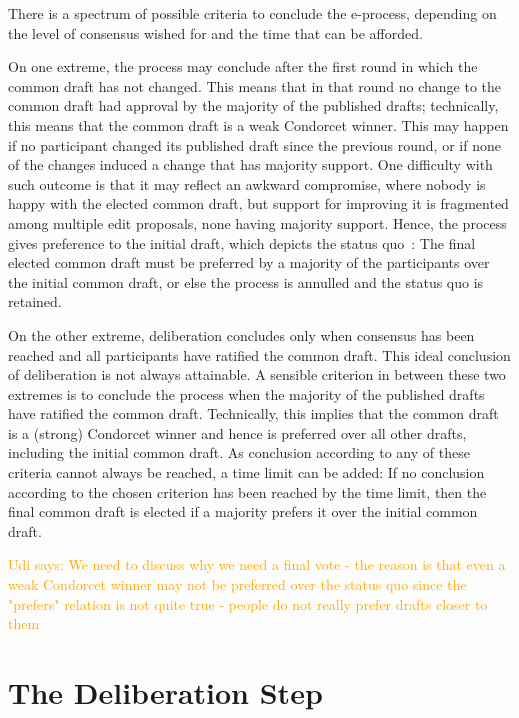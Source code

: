 \documentclass{llncs}
\newcommand{\udi}[1]{\textcolor{orange}{Udi says: #1}}
\begin{document}
There is a spectrum of possible criteria to conclude the e-process, depending on the level of consensus wished for and the time that can be afforded.

On one extreme, the process may conclude after the first round in which the common draft has not changed.  This means that in that round no change to the common draft had approval by the majority of the published drafts; technically, this means that the common draft is a weak Condorcet winner.  This may happen if no participant changed its published draft since the previous round, or if none of the changes induced a change that has majority support. One difficulty with such outcome is that it may reflect an awkward compromise, where nobody is happy with the elected common draft, but support for improving it is fragmented among multiple edit proposals, none having majority support.  Hence, the process gives preference to the initial draft, which depicts the status quo~\cite{realsoc}:  The final elected common draft must be preferred by a majority of the participants over the initial common draft, or else the process is annulled and the status quo is retained.

On the other extreme, deliberation concludes only when consensus has been reached and all participants have ratified the common draft.  This ideal conclusion of deliberation is not always attainable.  A sensible criterion in between these two extremes is to conclude the process when the majority of the published drafts have ratified the common draft.  Technically, this implies that the common draft is a (strong) Condorcet winner and hence is preferred over all other drafts, including the initial common draft.  
As conclusion according to any of these criteria cannot always be reached, a time limit can be added:
  If no conclusion according to the chosen criterion has been reached by the time limit, then the final common draft is elected if a majority prefers it over the initial common draft.

\udi{We need to discuss why we need a final vote - the reason is that even a weak Condorcet winner may not be preferred over the status quo since the "prefers" relation is not quite true - people do not really prefer drafts closer to them}

\section{The Deliberation Step}\label{section:deliberation step}
\end{document}
